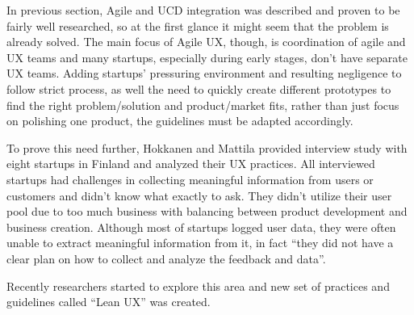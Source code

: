 \documentclass{article}
\begin{document}
In previous section, Agile and UCD integration was described and proven to be fairly well researched, so at the first glance it might seem that the problem is already solved. The main focus of Agile UX, though, is coordination of agile and UX teams and many startups, especially during early stages, don't have separate UX teams. Adding startups' pressuring environment and resulting negligence to follow strict process, as well the need to quickly create different prototypes to find the right problem/solution and product/market fits, rather than just focus on polishing one product, the guidelines must be adapted accordingly.

To prove this need further, Hokkanen and Mattila provided interview study with eight startups in Finland \cite{hokkanen2015ux} and analyzed their UX practices. All interviewed startups had challenges in collecting meaningful information from users or customers and didn't know what exactly to ask. They didn't utilize their user pool due to too much business with balancing between product development and business creation. Although most of startups logged user data, they were often unable to extract meaningful information from it, in fact ``they did not have a clear plan on how to collect and analyze the feedback and data''.

Recently researchers started to explore this area and new set of practices and guidelines called ``Lean UX'' was created.
\end{document}
